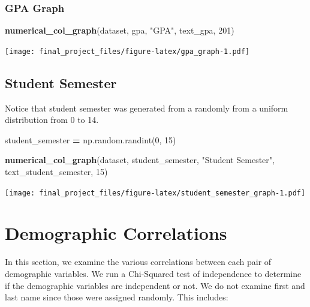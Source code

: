 \documentclass[
  twocolumn]{article}
\newenvironment{Shaded}{\begin{snugshade}}{\end{snugshade}}
\newcommand{\DecValTok}[1]{\textcolor[rgb]{0.00,0.00,0.81}{#1}}
\newcommand{\FunctionTok}[1]{\textcolor[rgb]{0.13,0.29,0.53}{\textbf{#1}}}
\newcommand{\NormalTok}[1]{#1}
\newcommand{\OperatorTok}[1]{\textcolor[rgb]{0.81,0.36,0.00}{\textbf{#1}}}
\newcommand{\StringTok}[1]{\textcolor[rgb]{0.31,0.60,0.02}{#1}}
\begin{document}
\subsubsection{GPA Graph}\label{gpa-graph}

\begin{Shaded}
\begin{Highlighting}[]
\FunctionTok{numerical\_col\_graph}\NormalTok{(dataset, gpa, }\StringTok{"GPA"}\NormalTok{, text\_gpa, }\DecValTok{201}\NormalTok{)}
\end{Highlighting}
\end{Shaded}

\texttt{[image: final\_project\_files/figure-latex/gpa\_graph-1.pdf]}

\subsection{Student Semester}\label{student-semester}

Notice that student semester was generated from a randomly from a
uniform distribution from 0 to 14.

\begin{Shaded}
\begin{Highlighting}[]
\NormalTok{student\_semester }\OperatorTok{=}\NormalTok{ np.random.randint(}\DecValTok{0}\NormalTok{, }\DecValTok{15}\NormalTok{)}
\end{Highlighting}
\end{Shaded}

\begin{Shaded}
\begin{Highlighting}[]
\FunctionTok{numerical\_col\_graph}\NormalTok{(dataset, student\_semester, }\StringTok{"Student Semester"}\NormalTok{, text\_student\_semester, }\DecValTok{15}\NormalTok{)}
\end{Highlighting}
\end{Shaded}

\texttt{[image: final\_project\_files/figure-latex/student\_semester\_graph-1.pdf]}

\section{Demographic Correlations}\label{demographic-correlations}

In this section, we examine the various correlations between each pair
of demographic variables. We run a Chi-Squared test of independence to
determine if the demographic variables are independent or not. We do not
examine first and last name since those were assigned randomly. This
includes:
\end{document}
